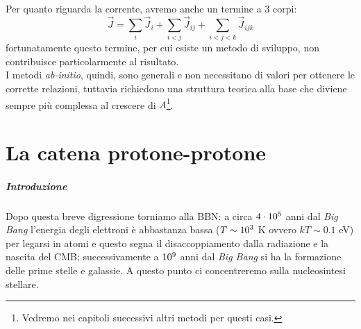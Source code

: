 Per quanto riguarda la corrente, avremo anche un termine a 3 corpi:
$$\vec{J} = \sum_i \vec{J}_i + \sum_{i<j} \vec{J}_{ij} + \sum_{i<j<k} \vec{J}_{ijk}$$
fortunatamente questo termine, per cui esiste un metodo di sviluppo, non contribuisce particolarmente al risultato.\\
I metodi \textit{ab-initio}, quindi, sono generali e non necessitano di  valori per ottenere le corrette relazioni, tuttavia richiedono una struttura teorica alla base che diviene sempre più complessa al crescere di $A$\footnote{Vedremo nei capitoli successivi altri metodi per questi casi.}. 



\chapter{La catena protone-protone}\label{cap-pp}

\paragraph{Introduzione} Dopo questa breve digressione torniamo alla BBN: a circa $4\cdot10^{5}$ anni dal \textit{Big Bang} l'energia degli elettroni è abbastanza bassa ($T\sim10^{3}$ K ovvero $kT\sim0.1$ eV) per legarsi in atomi e questo segna il disaccoppiamento dalla radiazione e la nascita del CMB; successivamente a $10^{9}$ anni dal \textit{Big Bang} si ha la formazione delle prime stelle e galassie. A questo punto ci concentreremo sulla nucleosintesi stellare.

